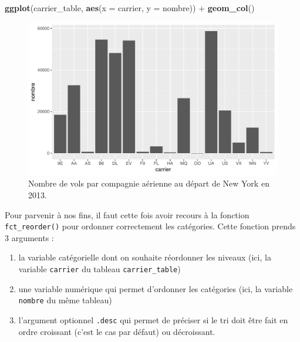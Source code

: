 \documentclass[a4paperpaper,]{article}
\newenvironment{Shaded}{\begin{snugshade}}{\end{snugshade}}
\newcommand{\DataTypeTok}[1]{\textcolor[rgb]{0.00,0.34,0.68}{#1}}
\newcommand{\KeywordTok}[1]{\textcolor[rgb]{0.12,0.11,0.11}{\textbf{#1}}}
\newcommand{\NormalTok}[1]{\textcolor[rgb]{0.12,0.11,0.11}{#1}}
\newcommand{\OperatorTok}[1]{\textcolor[rgb]{0.12,0.11,0.11}{#1}}
\newcommand{\StringTok}[1]{\textcolor[rgb]{0.75,0.01,0.01}{#1}}
\providecommand{\tightlist}{%
  \setlength{\itemsep}{0pt}\setlength{\parskip}{0pt}}
\theoremstyle{definition}
\theoremstyle{definition}
\theoremstyle{definition}
\theoremstyle{remark}
\begin{document}
\begin{Shaded}
\begin{Highlighting}[]
\KeywordTok{ggplot}\NormalTok{(carrier_table, }\KeywordTok{aes}\NormalTok{(}\DataTypeTok{x =}\NormalTok{ carrier, }\DataTypeTok{y =}\NormalTok{ nombre)) }\OperatorTok{+}
\StringTok{  }\KeywordTok{geom_col}\NormalTok{()}
\end{Highlighting}
\end{Shaded}

\begin{figure}[htpb]

{\centering \includegraphics[width=0.9\linewidth]{figure/bpcarriercol-1} 

}

\caption{Nombre de vols par compagnie aérienne au départ de New York en 2013.}\label{fig:bpcarriercol}
\end{figure}

Pour parvenir à nos fins, il faut cette fois avoir recours à la fonction
\texttt{fct\_reorder()} pour ordonner correctement les catégories. Cette
fonction prends 3 arguments :

\begin{enumerate}
\def\labelenumi{\arabic{enumi}.}
\tightlist
\item
  la variable catégorielle dont on souhaite réordonner les niveaux (ici,
  la variable \texttt{carrier} du tableau \texttt{carrier\_table})
\item
  une variable numérique qui permet d'ordonner les catégories (ici, la
  variable \texttt{nombre} du même tableau)
\item
  l'argument optionnel \texttt{.desc} qui permet de préciser si le tri
  doit être fait en ordre croissant (c'est le cas par défaut) ou
  décroissant.
\end{enumerate}
\end{document}
